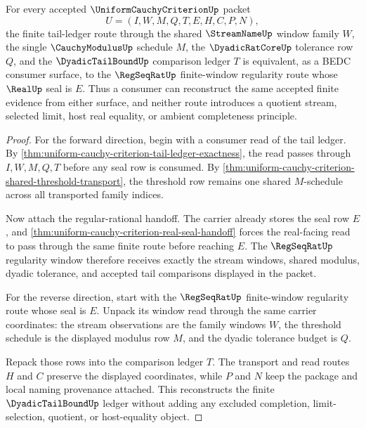 \begin{theorem}
\label{thm:uniform-cauchy-criterion-regseqrat-tail-equivalence}
For every accepted $\UniformCauchyCriterionUp$ packet
$$
U=(I,W,M,Q,T,E,H,C,P,N),
$$
the finite tail-ledger route through the shared $\StreamNameUp$ window family
$W$, the single $\CauchyModulusUp$ schedule $M$, the $\DyadicRatCoreUp$
tolerance row $Q$, and the $\DyadicTailBoundUp$ comparison ledger $T$ is
equivalent, as a BEDC consumer surface, to the $\RegSeqRatUp$ finite-window
regularity route whose $\RealUp$ seal is $E$. Thus a consumer can reconstruct
the same accepted finite evidence from either surface, and neither route
introduces a quotient stream, selected limit, host real equality, or ambient
completeness principle.
\end{theorem}
\begin{proof}
For the forward direction, begin with a consumer read of the tail ledger.
By \autoref{thm:uniform-cauchy-criterion-tail-ledger-exactness}, the read
passes through $I,W,M,Q,T$ before any seal row is consumed. By
\autoref{thm:uniform-cauchy-criterion-shared-threshold-transport}, the
threshold row remains one shared $M$-schedule across all transported family
indices.

Now attach the regular-rational handoff. The carrier already stores the seal
row $E$, and \autoref{thm:uniform-cauchy-criterion-real-seal-handoff} forces
the real-facing read to pass through the same finite route before reaching
$E$. The $\RegSeqRatUp$ regularity window therefore receives exactly the
stream windows, shared modulus, dyadic tolerance, and accepted tail
comparisons displayed in the packet.

For the reverse direction, start with the $\RegSeqRatUp$ finite-window
regularity route whose seal is $E$. Unpack its window read through the same
carrier coordinates: the stream observations are the family windows $W$, the
threshold schedule is the displayed modulus row $M$, and the dyadic tolerance
budget is $Q$.

Repack those rows into the comparison ledger $T$. The transport and read
routes $H$ and $C$ preserve the displayed coordinates, while $P$ and $N$ keep
the package and local naming provenance attached. This reconstructs the
finite $\DyadicTailBoundUp$ ledger without adding any excluded completion,
limit-selection, quotient, or host-equality object.
\end{proof}

